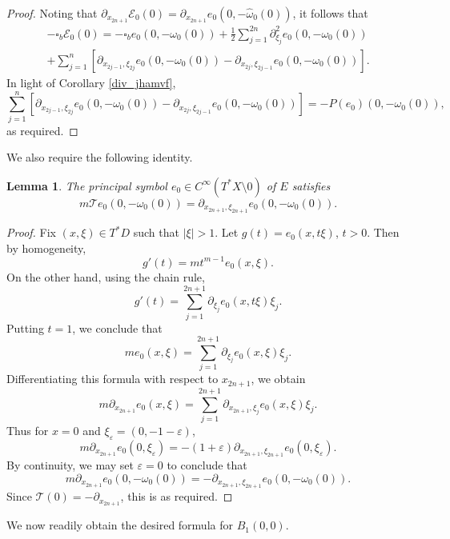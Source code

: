 \documentclass{article}
\newtheorem{lemma}[theorem]{Lemma}
\newcommand{\mce}{\mathcal E}
\newcommand{\mct}{\mathcal T}
\begin{document}
\begin{proof}
%
Noting that $\partial_{x_{2n+1}} \mce_0(0) = \partial_{x_{2n+1}} e_0(0, -\hat \omega_0(0))$, it follows that
\begin{multline*} -\square_b \mce_0(0) = -\square_b e_0(0, -\omega_0(0)) + \frac 1 2 \sum_{j=1}^{2n} \partial^2_{\xi_j} e_0(0, -\omega_0(0))\\ + \sum_{j=1}^n \left[\partial_{x_{2j-1}, \xi_{2j}} e_0(0, -\omega_0(0)) - \partial_{x_{2j}, \xi_{2j-1}} e_0(0, - \omega_0(0))\right].\end{multline*}
In light of Corollary \ref{div_jhamvf},$$\sum_{j=1}^n \left[\partial_{x_{2j-1}, \xi_{2j}} e_0(0, -\omega_0(0)) - \partial_{x_{2j}, \xi_{2j-1}} e_0(0, - \omega_0(0))\right] = -P(e_0)(0, -\omega_0(0)),$$
as required.
\end{proof}

We also require the following identity.
%
\begin{lemma}\label{princ_symb_id} The principal symbol $e_0 \in C^\infty(T^* X\setminus 0)$ of $E$ satisfies $$m \mct e_0(0, -\omega_0(0)) =\partial_{x_{2n+1}, \xi_{2n+1}} e_0(0, -\omega_0(0)).$$ \end{lemma}
%
\begin{proof}
Fix $(x,\xi) \in T^*D$ such that $|\xi| > 1$. Let $g(t) = e_0(x, t\xi)$, $t > 0$. Then by homogeneity, $$g'(t) = m t^{m-1} e_0(x, \xi).$$
On the other hand, using the chain rule, $$g'(t) = \sum_{j=1}^{2n+1} \partial_{\xi_j} e_0(x, t\xi) \xi_j.$$
Putting $t = 1$, we conclude that $$m e_0(x, \xi) = \sum_{j=1}^{2n+1} \partial_{\xi_j} e_0(x, \xi) \xi_j.$$
Differentiating this formula with respect to $x_{2n+1}$, we obtain $$m \partial_{x_{2n+1}} e_0(x, \xi) = \sum_{j=1}^{2n+1} \partial_{x_{2n+1}, \xi_j} e_0(x, \xi) \xi_j.$$
Thus for $x = 0$ and $\xi_\varepsilon = (0, -1-\varepsilon)$, $$m \partial_{x_{2n+1}} e_0(0, \xi_{\varepsilon}) = -(1+\varepsilon)\partial_{x_{2n+1}, \xi_{2n+1}} e_0(0, \xi_\varepsilon).$$
By continuity, we may set $\varepsilon = 0$ to conclude that $$m \partial_{x_{2n+1}} e_0(0,-\omega_0(0)) = -\partial_{x_{2n+1}, \xi_{2n+1}} e_0(0, -\omega_0(0)).$$
Since $\mct(0) = -\partial_{x_{2n+1}}$, this is as required.
%
\end{proof}
%
We now readily obtain the desired formula for $B_{1}(0,0)$.
\end{document}
